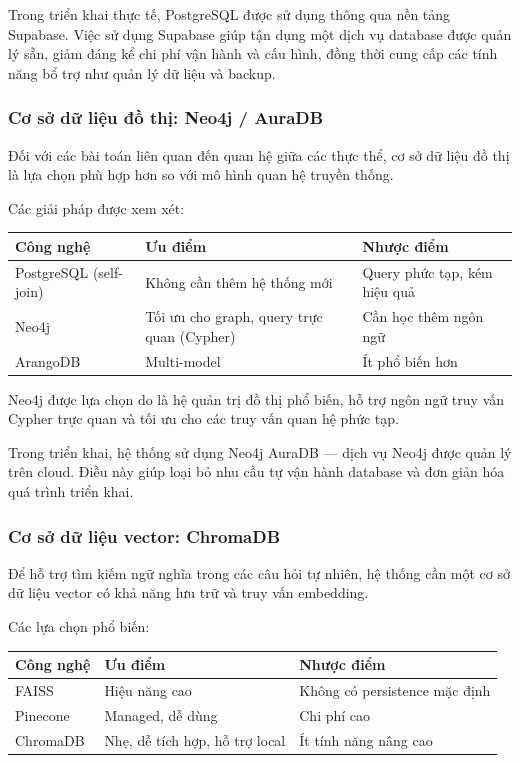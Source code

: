 Trong triển khai thực tế, PostgreSQL được sử dụng thông qua nền tảng Supabase. Việc sử dụng Supabase giúp tận dụng một dịch vụ database được quản lý sẵn, giảm đáng kể chi phí vận hành và cấu hình, đồng thời cung cấp các tính năng bổ trợ như quản lý dữ liệu và backup.

\subsubsection{Cơ sở dữ liệu đồ thị: Neo4j / AuraDB}

Đối với các bài toán liên quan đến quan hệ giữa các thực thể, cơ sở dữ liệu đồ thị là lựa chọn phù hợp hơn so với mô hình quan hệ truyền thống.

Các giải pháp được xem xét:

\begin{tabular}{|p{3cm}|p{5cm}|p{5cm}|}
\hline
Công nghệ & Ưu điểm & Nhược điểm \\
\hline
PostgreSQL (self-join) & Không cần thêm hệ thống mới & Query phức tạp, kém hiệu quả \\
\hline
Neo4j & Tối ưu cho graph, query trực quan (Cypher) & Cần học thêm ngôn ngữ \\
\hline
ArangoDB & Multi-model & Ít phổ biến hơn \\
\hline
\end{tabular}

Neo4j được lựa chọn do là hệ quản trị đồ thị phổ biến, hỗ trợ ngôn ngữ truy vấn Cypher trực quan và tối ưu cho các truy vấn quan hệ phức tạp.

Trong triển khai, hệ thống sử dụng Neo4j AuraDB — dịch vụ Neo4j được quản lý trên cloud. Điều này giúp loại bỏ nhu cầu tự vận hành database và đơn giản hóa quá trình triển khai.

\subsubsection{Cơ sở dữ liệu vector: ChromaDB}

Để hỗ trợ tìm kiếm ngữ nghĩa trong các câu hỏi tự nhiên, hệ thống cần một cơ sở dữ liệu vector có khả năng lưu trữ và truy vấn embedding.

Các lựa chọn phổ biến:

\begin{tabular}{|p{2.5cm}|p{5.5cm}|p{5.5cm}|}
\hline
Công nghệ & Ưu điểm & Nhược điểm \\
\hline
FAISS & Hiệu năng cao & Không có persistence mặc định \\
\hline
Pinecone & Managed, dễ dùng & Chi phí cao \\
\hline
ChromaDB & Nhẹ, dễ tích hợp, hỗ trợ local & Ít tính năng nâng cao \\
\hline
\end{tabular}


